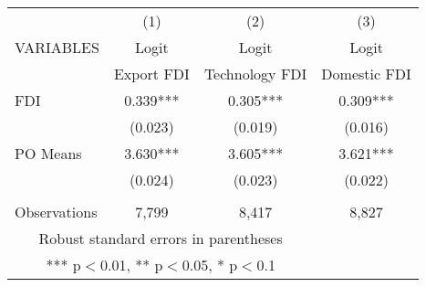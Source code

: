 \documentclass[]{article}
\begin{document}
\begin{tabular}{lccc} \hline
 & (1) & (2) & (3) \\
VARIABLES & Logit  & Logit  & Logit  \\ 
&Export FDI&Technology FDI&Domestic FDI\\ \hline
FDI & 0.339***   & 0.305***   & 0.309***   \\
 & (0.023) &   (0.019) &   (0.016)   \\
PO Means &   3.630*** &   3.605*** & 3.621*** \\
 &   (0.024) &   (0.023) &   (0.022) \\
 &  &  &    \\
 Observations & 7,799  & 8,417  & 8,827  \\ \hline
\multicolumn{3}{c}{ Robust standard errors in parentheses} \\
\multicolumn{3}{c}{ *** p$<$0.01, ** p$<$0.05, * p$<$0.1} \\
\end{tabular}
\end{document}

